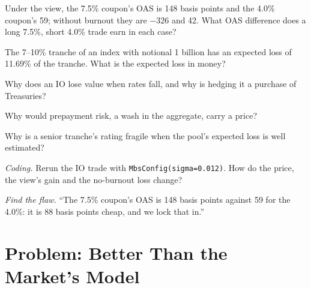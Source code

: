 \begin{exercise}[$\star$]\label{exo:s2:mortgage-and-structured-credit-strategies:2}
Under the view, the 7.5\% coupon's OAS is 148 basis points and the 4.0\% coupon's 59; without burnout they are $-326$ and 42. What OAS difference
does a long 7.5\%, short 4.0\% trade earn in each case?
\end{exercise}

\begin{exercise}[$\star$]\label{exo:s2:mortgage-and-structured-credit-strategies:3}
The 7--10\% tranche of an index with notional 1 billion has an expected loss of 11.69\% of the tranche. What is the expected loss in money?
\end{exercise}

\begin{exercise}[$\star\star$]\label{exo:s2:mortgage-and-structured-credit-strategies:4}
Why does an IO lose value when rates fall, and why is hedging it a purchase of Treasuries?
\end{exercise}

\begin{exercise}[$\star\star$]\label{exo:s2:mortgage-and-structured-credit-strategies:5}
Why would prepayment risk, a wash in the aggregate, carry a price?
\end{exercise}

\begin{exercise}[$\star\star$]\label{exo:s2:mortgage-and-structured-credit-strategies:6}
Why is a senior tranche's rating fragile when the pool's expected loss is well estimated?
\end{exercise}

\begin{exercise}[$\star\star\star$]\label{exo:s2:mortgage-and-structured-credit-strategies:7}
\emph{Coding.} Rerun the IO trade with \texttt{MbsConfig(sigma=0.012)}. How do the price, the view's gain and the no-burnout loss change?
\end{exercise}

\begin{exercise}[$\star\star\star$]\label{exo:s2:mortgage-and-structured-credit-strategies:8}
\emph{Find the flaw.} ``The 7.5\% coupon's OAS is 148 basis points against 59 for the 4.0\%: it is 88 basis points cheap, and we lock that in.''
\end{exercise}

\section{Problem: Better Than the Market's Model}

